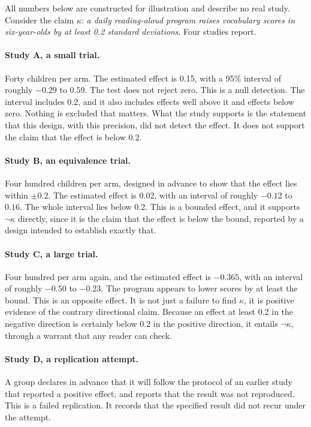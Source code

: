 \documentclass[11pt]{article}
\newcommand{\nk}[1]{\neg #1}
\begin{document}
All numbers below are constructed for illustration and describe no real study. Consider the claim $\kappa$: \emph{a daily reading-aloud program raises vocabulary scores in six-year-olds by at least 0.2 standard deviations}. Four studies report.

\paragraph{Study A, a small trial.} Forty children per arm. The estimated effect is 0.15, with a 95\% interval of roughly $-0.29$ to $0.59$. The test does not reject zero. This is a null detection. The interval includes 0.2, and it also includes effects well above it and effects below zero. Nothing is excluded that matters. What the study supports is the statement that this design, with this precision, did not detect the effect. It does not support the claim that the effect is below 0.2.

\paragraph{Study B, an equivalence trial.} Four hundred children per arm, designed in advance to show that the effect lies within $\pm 0.2$. The estimated effect is 0.02, with an interval of roughly $-0.12$ to $0.16$. The whole interval lies below 0.2. This is a bounded effect, and it supports $\nk\kappa$ directly, since it is the claim that the effect is below the bound, reported by a design intended to establish exactly that.

\paragraph{Study C, a large trial.} Four hundred per arm again, and the estimated effect is $-0.365$, with an interval of roughly $-0.50$ to $-0.23$. The program appears to lower scores by at least the bound. This is an opposite effect. It is not just a failure to find $\kappa$, it is positive evidence of the contrary directional claim. Because an effect at least 0.2 in the negative direction is certainly below 0.2 in the positive direction, it entails $\nk\kappa$, through a warrant that any reader can check.

\paragraph{Study D, a replication attempt.} A group declares in advance that it will follow the protocol of an earlier study that reported a positive effect, and reports that the result was not reproduced. This is a failed replication. It records that the specified result did not recur under the attempt.
\end{document}
